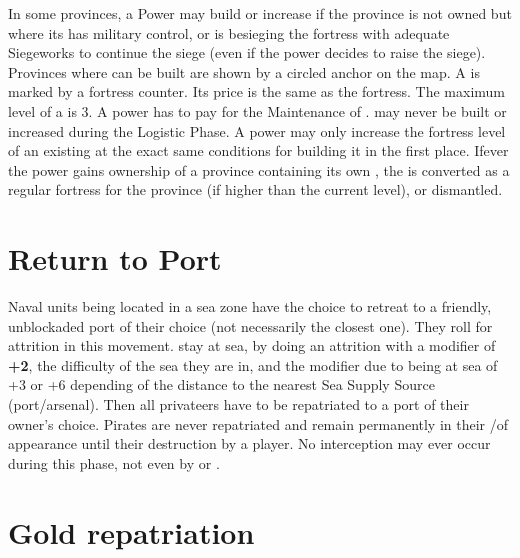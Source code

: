 \label{chRedep:BuildPresidios}
In some provinces, a Power may build or increase \Presidios if the province is
not owned but where its has military control, or is besieging the fortress
with adequate Siegeworks to continue the siege (even if the power decides to
raise the siege).
\bparag Provinces where \Presidios can be built are shown by a circled anchor
on the map.
\bparag A \Presidio is marked by a fortress counter. Its price is the same as
the fortress. The maximum level of a \Presidio is 3.  A power has to pay for
the Maintenance of \Presidio.  \Presidios may never be built or increased
during the Logistic Phase.
\bparag A power may only increase the fortress level of an existing \Presidios
at the exact same conditions for building it in the first place.
\bparag Ifever the power gains ownership of a province containing its own
\Presidio, the \Presidio is converted as a regular fortress for the province
(if higher than the current level), or dismantled.



\section{Return to Port}

\aparag Naval units being located in a sea zone have the choice to
\bparag retreat to a friendly, unblockaded port of their choice (not
necessarily the closest one). They roll for attrition in this movement.
\bparag stay at sea, by doing an attrition with a modifier of {\bf +2}, the
difficulty of the sea they are in, and the modifier due to being at sea of +3
or +6 depending of the distance to the nearest Sea Supply Source
(port/arsenal).
\aparag Then all privateers have to be repatriated to a port of their owner's
choice.
\aparag Pirates are never repatriated and remain permanently in their
\STZ/\CTZ of appearance until their destruction by a player.
\aparag No interception may ever occur during this phase, not even by
\Presidios or \StraitFort.



\section{Gold repatriation}\label{chRedep:GoldRepatriation}

